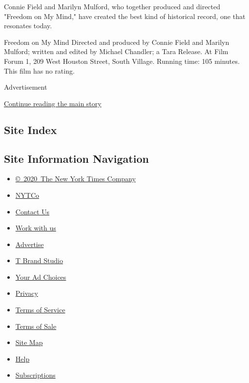 Connie Field and Marilyn Mulford, who together produced and directed
"Freedom on My Mind," have created the best kind of historical record,
one that resonates today.

Freedom on My Mind Directed and produced by Connie Field and Marilyn
Mulford; written and edited by Michael Chandler; a Tara Release. At Film
Forum 1, 209 West Houston Street, South Village. Running time: 105
minutes. This film has no rating.

Advertisement

\protect\hyperlink{after-bottom}{Continue reading the main story}

\hypertarget{site-index}{%
\subsection{Site Index}\label{site-index}}

\hypertarget{site-information-navigation}{%
\subsection{Site Information
Navigation}\label{site-information-navigation}}

\begin{itemize}
\tightlist
\item
  \href{https://help.nytimes.com/hc/en-us/articles/115014792127-Copyright-notice}{©~2020~The
  New York Times Company}
\end{itemize}

\begin{itemize}
\tightlist
\item
  \href{https://www.nytco.com/}{NYTCo}
\item
  \href{https://help.nytimes.com/hc/en-us/articles/115015385887-Contact-Us}{Contact
  Us}
\item
  \href{https://www.nytco.com/careers/}{Work with us}
\item
  \href{https://nytmediakit.com/}{Advertise}
\item
  \href{http://www.tbrandstudio.com/}{T Brand Studio}
\item
  \href{https://www.nytimes.com/privacy/cookie-policy\#how-do-i-manage-trackers}{Your
  Ad Choices}
\item
  \href{https://www.nytimes.com/privacy}{Privacy}
\item
  \href{https://help.nytimes.com/hc/en-us/articles/115014893428-Terms-of-service}{Terms
  of Service}
\item
  \href{https://help.nytimes.com/hc/en-us/articles/115014893968-Terms-of-sale}{Terms
  of Sale}
\item
  \href{https://spiderbites.nytimes.com}{Site Map}
\item
  \href{https://help.nytimes.com/hc/en-us}{Help}
\item
  \href{https://www.nytimes.com/subscription?campaignId=37WXW}{Subscriptions}
\end{itemize}
